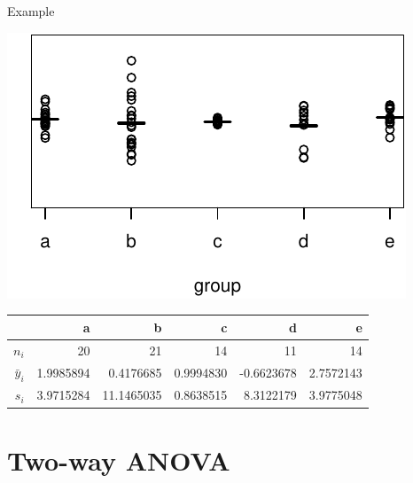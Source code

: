 \begin{frame}{Example}

    \begin{center}
        \includegraphics{ex23-1.pdf}
    \end{center}
    



    \begin{center}
\begin{tabular}{rrrrrr}
  \hline
  & a & b & c & d & e \\ 
  \hline
  $n_i$ &  20 & 21 & 14 & 11 & 14 \\
  $\bar y_i$ & 1.9985894 & 0.4176685 & 0.9994830 & -0.6623678 & 2.7572143 \\
  $s_i$ & 3.9715284 & 11.1465035 & 0.8638515 & 8.3122179 & 3.9775048 \\
   \hline
\end{tabular}
    \end{center}
\end{frame}

\section{Two-way ANOVA}


